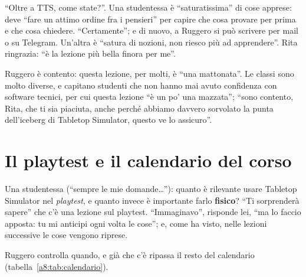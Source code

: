 ``Oltre a TTS, come state?''. Una studentessa è ``saturatissima'' di cose apprese: deve
``fare un attimo ordine fra i pensieri'' per capire che cosa provare per prima e che
cosa chiedere. ``Certamente''; e di nuovo, a Ruggero si può scrivere per mail o su
Telegram. Un'altra è ``satura di nozioni, non riesco più ad apprendere''. Rita
ringrazia: ``è la lezione più bella finora per me''.

Ruggero è contento: questa lezione, per molti, è ``una mattonata''. Le classi sono
molto diverse, e capitano studenti che non hanno mai avuto confidenza con software
tecnici, per cui questa lezione ``è un po' una mazzata''; ``sono contento, Rita, che ti
sia piaciuta, anche perché abbiamo davvero sorvolato la punta dell'iceberg di Tabletop
Simulator, questo ve lo assicuro''.

\section{Il playtest e il calendario del corso}
\label{a8:sec:calendario}

Una studentessa (``sempre le mie domande\ldots''): quanto è rilevante usare Tabletop
Simulator nel \emph{playtest}, e quanto invece è importante farlo \textbf{fisico}? ``Ti
sorprenderà sapere'' che c'è una lezione sul playtest. ``Immaginavo'', risponde lei, ``ma
lo faccio apposta: tu mi anticipi ogni volta le cose''; e, come ha visto, nelle lezioni
successive le cose vengono riprese.

Ruggero controlla quando, e già che c'è ripassa il resto del calendario
(tabella~\ref{a8:tab:calendario}).

